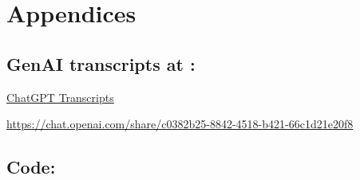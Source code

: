 \documentclass{article}
\begin{document}
\section*{Appendices}
\subsection*{GenAI transcripts at :}
\href{https://chat.openai.com/share/c0382b25-8842-4518-b421-66c1d21e20f8}{ChatGPT Transcripts}

\href{https://chat.openai.com/share/c0382b25-8842-4518-b421-66c1d21e20f8}{https://chat.openai.com/share/c0382b25-8842-4518-b421-66c1d21e20f8}


\subsection*{Code:}
\end{document}
